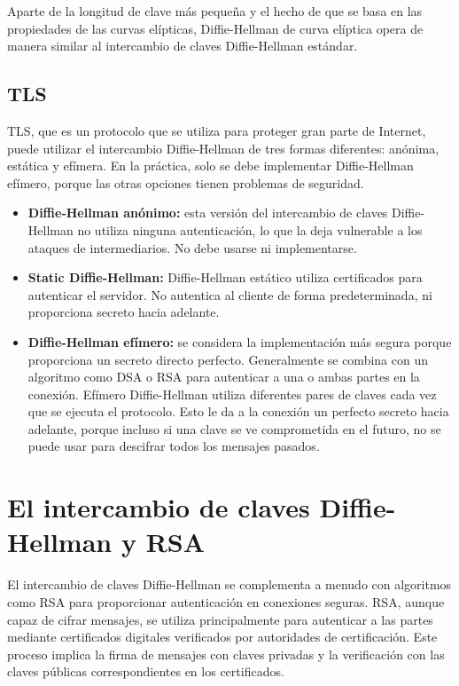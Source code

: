 \documentclass[11pt]{article}
\begin{document}
Aparte de la longitud de clave más pequeña y el hecho de que se basa en las propiedades de las curvas elípticas, Diffie-Hellman de curva elíptica opera de manera similar al intercambio de claves Diffie-Hellman estándar.

\subsection{TLS}

TLS, que es un protocolo que se utiliza para proteger gran parte de Internet, puede utilizar el intercambio Diffie-Hellman de tres formas diferentes: anónima, estática y efímera. En la práctica, solo se debe implementar Diffie-Hellman efímero, porque las otras opciones tienen problemas de seguridad.


\begin{itemize}
    \item \textbf{Diffie-Hellman anónimo:} esta versión del intercambio de claves Diffie-Hellman no utiliza ninguna autenticación, lo que la deja vulnerable a los ataques de intermediarios. No debe usarse ni implementarse.
    \item \textbf{Static Diffie-Hellman:} Diffie-Hellman estático utiliza certificados para autenticar el servidor. No autentica al cliente de forma predeterminada, ni proporciona secreto hacia adelante.
    \item \textbf{Diffie-Hellman efímero:} se considera la implementación más segura porque proporciona un secreto directo perfecto. Generalmente se combina con un algoritmo como DSA o RSA para autenticar a una o ambas partes en la conexión. Efímero Diffie-Hellman utiliza diferentes pares de claves cada vez que se ejecuta el protocolo. Esto le da a la conexión un perfecto secreto hacia adelante, porque incluso si una clave se ve comprometida en el futuro, no se puede usar para descifrar todos los mensajes pasados.\\
\end{itemize}


\section{El intercambio de claves Diffie-Hellman y RSA}

El intercambio de claves Diffie-Hellman se complementa a menudo con algoritmos como RSA para proporcionar autenticación en conexiones seguras. RSA, aunque capaz de cifrar mensajes, se utiliza principalmente para autenticar a las partes mediante certificados digitales verificados por autoridades de certificación. Este proceso implica la firma de mensajes con claves privadas y la verificación con las claves públicas correspondientes en los certificados.
\end{document}
